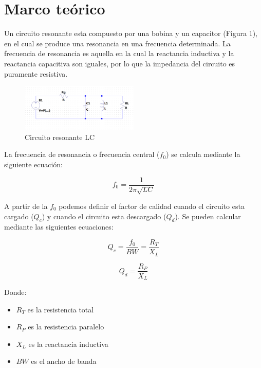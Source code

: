 \section{Marco teórico}


Un circuito resonante esta compuesto por una bobina y un capacitor (Figura 1), en el cual se produce una resonancia en una frecuencia determinada. La frecuencia de resonancia es aquella en 
la cual la reactancia inductiva y la reactancia capacitiva son iguales, por lo que la impedancia del circuito es puramente resistiva. 

\begin{figure}[h]
    \centering
    \includegraphics[width=0.5\textwidth]{Imagenes/circuito_resonante.png}
    \caption{Circuito resonante LC}
    \label{fig:circuito_resonante}
\end{figure}

La frecuencia de resonancia o frecuencia central ($f_0$) se calcula mediante la siguiente ecuación:

\begin{equation}
    f_0 = \frac{1}{2\pi \sqrt{LC}}
\end{equation}

A partir de la $f_0$ podemos definir el factor de calidad cuando el circuito esta cargado ($Q_c$) y cuando el circuito esta descargado ($Q_d$). 
Se pueden calcular mediante las siguientes ecuaciones:

\begin{equation}
    Q_c = \frac{f_0}{BW} = \frac{R_T}{X_L}
\end{equation}

\begin{equation}
    Q_d = \frac{R_P}{X_L}
\end{equation}

Donde: 

\begin{itemize}
    \item $R_T$ es la resistencia total
    \item $R_P$ es la resistencia paralelo
    \item $X_L$ es la reactancia inductiva
    \item $BW$ es el ancho de banda
\end{itemize}

